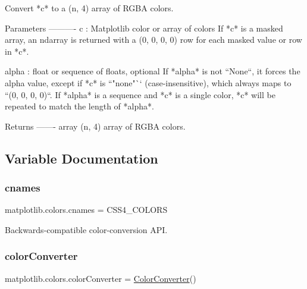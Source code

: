 \begin{DoxyVerb}Convert *c* to a (n, 4) array of RGBA colors.

Parameters
----------
c : Matplotlib color or array of colors
    If *c* is a masked array, an ndarray is returned with a (0, 0, 0, 0)
    row for each masked value or row in *c*.

alpha : float or sequence of floats, optional
    If *alpha* is not ``None``, it forces the alpha value, except if *c* is
    ``"none"`` (case-insensitive), which always maps to ``(0, 0, 0, 0)``.
    If *alpha* is a sequence and *c* is a single color, *c* will be
    repeated to match the length of *alpha*.

Returns
-------
array
    (n, 4) array of RGBA colors.\end{DoxyVerb}
 

\subsection{Variable Documentation}
\mbox{\label{namespacematplotlib_1_1colors_a5786340f4f4fddf7665e5246eaf75d68}} 
\subsubsection{\texorpdfstring{cnames}{cnames}}
{\footnotesize\ttfamily matplotlib.\+colors.\+cnames = C\+S\+S4\+\_\+\+C\+O\+L\+O\+RS}



Backwards-\/compatible color-\/conversion A\+PI. 

\mbox{\label{namespacematplotlib_1_1colors_ae0f1473cd90343845e171b405e1add8c}} 
\subsubsection{\texorpdfstring{color\+Converter}{colorConverter}}
{\footnotesize\ttfamily matplotlib.\+colors.\+color\+Converter = \hyperlink{classmatplotlib_1_1colors_1_1ColorConverter}{Color\+Converter}()}

\mbox{\label{namespacematplotlib_1_1colors_a14c6e2d10c728267bef28e5b3c9c3142}} 
